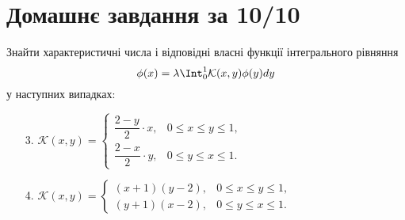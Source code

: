 \setcounter{section}{4}

\section{Домашнє завдання за 10/10}

\begin{problem}[5.36]
    Знайти характеристичні числа і відповідні власні функції інтегрального рівняння \[ \phi(x) = \lambda \Int_0^1 \mathcal{K}(x,y)\phi(y) dy \] у наступних випадках:
    \begin{enumerate}
        \item[3.] $\mathcal{K}(x,y) = \begin{cases} \dfrac{2 - y}{2} \cdot x, & 0 \le x \le y \le 1, \\ \dfrac{2 - x}{2} \cdot y, & 0 \le y \le x \le 1. \end{cases}$
        \item[4.] $\mathcal{K}(x,y) = \begin{cases} (x + 1) (y - 2), & 0 \le x \le y \le 1, \\ (y + 1) (x - 2), & 0 \le y \le x \le 1. \end{cases}$
    \end{enumerate}
\end{problem}

